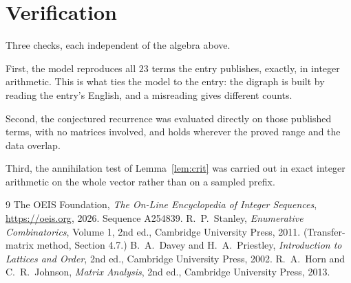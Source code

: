\documentclass[11pt,a4paper]{article}
\theoremstyle{plain}
\theoremstyle{definition}
\begin{document}
\section{Verification}

Three checks, each independent of the algebra above.

First, the model reproduces all $23$ terms the entry publishes, exactly, in integer
arithmetic. This is what ties the model to the entry: the digraph is built by reading the
entry's English, and a misreading gives different counts.

Second, the conjectured recurrence was evaluated directly on those published terms, with no
matrices involved, and holds wherever the proved range and the data overlap.

Third, the annihilation test of Lemma~\ref{lem:crit} was carried out in exact integer
arithmetic on the whole vector rather than on a sampled prefix.

\begin{thebibliography}{9}
 The OEIS Foundation, \emph{The On-Line Encyclopedia of Integer
Sequences}, \url{https://oeis.org}, 2026. Sequence A254839.
 R.~P.~Stanley, \emph{Enumerative Combinatorics}, Volume 1, 2nd ed.,
Cambridge University Press, 2011. (Transfer-matrix method, Section 4.7.)
 B.~A.~Davey and H.~A.~Priestley, \emph{Introduction to Lattices and
Order}, 2nd ed., Cambridge University Press, 2002.
 R.~A.~Horn and C.~R.~Johnson, \emph{Matrix Analysis}, 2nd ed., Cambridge
University Press, 2013.
\end{thebibliography}
\end{document}
